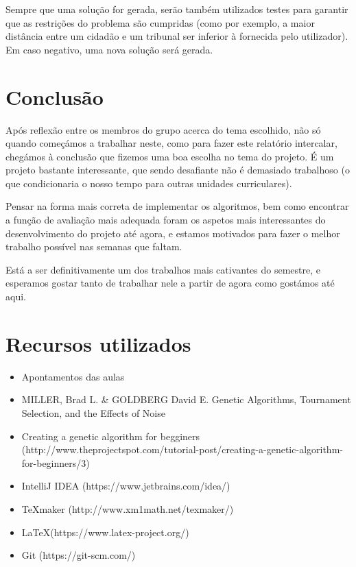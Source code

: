 \documentclass[11pt,a4paper,reqno]{article}
\numberwithin{equation}{section}
\begin{document}
Sempre que uma solução for gerada, serão também utilizados testes para garantir que as restrições do problema são cumpridas (como por exemplo, a maior distância entre um cidadão e um tribunal ser inferior à fornecida pelo utilizador). Em caso negativo, uma nova solução será gerada.



\section{Conclusão}
Após reflexão entre os membros do grupo acerca do tema escolhido, não só quando começámos a trabalhar neste, como para fazer este relatório intercalar, chegámos à conclusão que fizemos uma boa escolha no tema do projeto. É um projeto bastante interessante, que sendo desafiante não é demasiado trabalhoso (o que condicionaria o nosso tempo para outras unidades curriculares).

Pensar na forma mais correta de implementar os algoritmos, bem como encontrar a função de avaliação mais adequada foram os aspetos mais interessantes do desenvolvimento do projeto até agora, e estamos motivados para fazer o melhor trabalho possível nas semanas que faltam.

Está a ser definitivamente um dos trabalhos mais cativantes do semestre, e esperamos gostar tanto de trabalhar nele a partir de agora como gostámos até aqui.

\section{Recursos utilizados}

\begin{itemize}
\item Apontamentos das aulas
\item MILLER, Brad L. & GOLDBERG David E. Genetic Algorithms, Tournament Selection, and the Effects of Noise
\item Creating a genetic algorithm for begginers (http://www.theprojectspot.com/tutorial-post/creating-a-genetic-algorithm-for-beginners/3)
\item IntelliJ IDEA (https://www.jetbrains.com/idea/)
\item TeXmaker (http://www.xm1math.net/texmaker/)
\item LaTeX(https://www.latex-project.org/)
\item Git (https://git-scm.com/)

\end{itemize}
\end{document}
